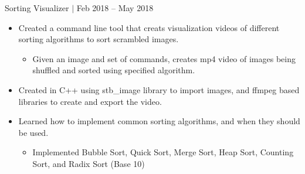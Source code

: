 \documentclass[12pt]{article}
\newcommand{\projText}[2]{\noindent#1 $|$ {\color{textGray} #2}}
\begin{document}
    \projText{Sorting Visualizer}{Feb 2018 -- May 2018}
    \begin{small}
        \begin{itemize}
            \itemsep0em 
            \item {\color{textGray} Created a command line tool that creats visualization videos of different sorting algorithms to sort scrambled images.}
                \begin{itemize}[label=$\circ$,topsep=-5px,partopsep=0px]
                    \itemsep0em 
                    \item {\color{textGray} Given an image and set of commands, creates mp4 video of images being shuffled and sorted using specified algorithm.}
                \end{itemize}
            \item {\color{textGray} Created in C++ using stb\_image library to import images, and ffmpeg based libraries to create and export the video.}
            \item {\color{textGray} Learned how to implement common sorting algorithms, and when they should be used.}
                \begin{itemize}[label=$\circ$,topsep=-5px,partopsep=0px]
                    \itemsep0em 
                    \item {\color{textGray} Implemented Bubble Sort, Quick Sort, Merge Sort, Heap Sort, Counting Sort, and Radix Sort (Base 10)}
                \end{itemize}
        \end{itemize}
    \end{small}
\end{document}
